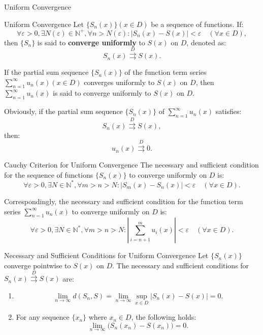 \documentclass[11pt]{../../TexTemplate/elegantbook}
\begin{document}
\begin{leftbarTitle}{Uniform Convergence}\end{leftbarTitle}
\begin{definition}{Uniform Convergence}
    Let \( \{ S_n(x) \} (x \in D) \) be a sequence of functions. If:
    \[
    \forall \varepsilon > 0, \exists N(\varepsilon) \in \mathbb{N}^+, \forall n > N(\varepsilon): 
    |S_n(x) - S(x)| < \varepsilon \quad (\forall x \in D),
    \]
    then \( \{ S_n \} \) is said to \textbf{converge uniformly} to \( S(x) \) on \( D \), denoted as:
    \[
    S_n(x) \mathop{\rightrightarrows}\limits^{D} S(x).
    \]

    If the partial sum sequence \( \{ S_n(x) \} \) of the function term series 
    \( \sum_{n=1}^\infty u_n(x) (x \in D) \) converges uniformly to \( S(x) \) on \( D \), 
    then \( \sum_{n=1}^\infty u_n(x) \) is said to converge uniformly to \( S(x) \) on \( D \).
\end{definition}
Obviously, if the partial sum sequence \( \{ S_n(x) \} \) of \( \sum_{n=1}^\infty u_n(x) \) satisfies:
\[
S_n(x) \mathop{\rightrightarrows}\limits^{D} S(x),
\]
then:
\[
u_n(x) \mathop{\rightrightarrows}\limits^{D} 0.
\]

\begin{theorem}{Cauchy Criterion for Uniform Convergence}
    The necessary and sufficient condition for the sequence of functions \( \{ S_n(x) \} \) to converge uniformly on \( D \) is:
    \[
    \forall \varepsilon > 0, \exists N \in \mathbb{N}^*, \forall m > n > N: 
    |S_m(x) - S_n(x)| < \varepsilon \quad (\forall x \in D).
    \]

    Correspondingly, the necessary and sufficient condition for the function term series 
    \( \sum_{n=1}^\infty u_n(x) \) to converge uniformly on \( D \) is:
    \[
    \forall \varepsilon > 0, \exists N \in \mathbb{N}^*, \forall m > n > N: 
    \left| \sum_{i=n+1}^m u_i(x) \right| < \varepsilon \quad (\forall x \in D).
    \]
\end{theorem}

\begin{theorem}{Necessary and Sufficient Conditions for Uniform Convergence}
    Let \( \{ S_n(x) \} \) converge pointwise to \( S(x) \) on \( D \). 
    The necessary and sufficient conditions for \( S_n(x) \mathop{\rightrightarrows}\limits^{D} S(x) \) are:
    \begin{enumerate}
        \item  
            \[
            \lim_{n \to \infty} d(S_n, S) = \lim_{n \to \infty} \sup_{x \in D} |S_n(x) - S(x)| = 0.
            \]
        \item For any sequence \( \{ x_n \} \) where \( x_n \in D \), the following holds:
            \[
            \lim_{n \to \infty} \big(S_n(x_n) - S(x_n)\big) = 0.
            \]
    \end{enumerate}
\end{theorem}
\end{document}
